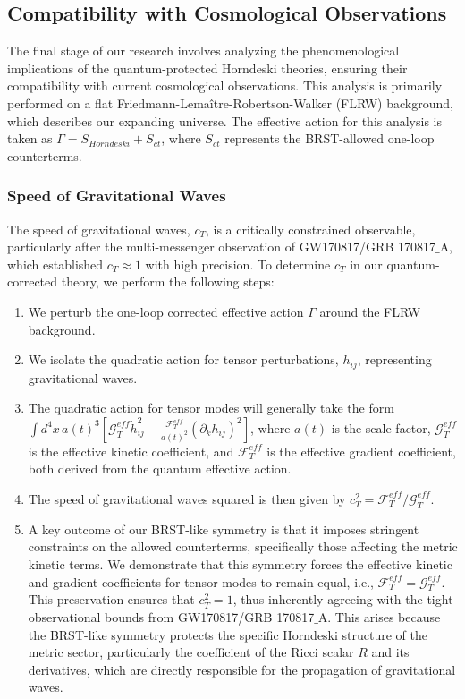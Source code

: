 \documentclass[twocolumn]{aastex631}
\begin{document}
\subsection{Compatibility with Cosmological Observations}

The final stage of our research involves analyzing the phenomenological implications of the quantum-protected Horndeski theories, ensuring their compatibility with current cosmological observations. This analysis is primarily performed on a flat Friedmann-Lemaître-Robertson-Walker (FLRW) background, which describes our expanding universe. The effective action for this analysis is taken as $\Gamma = S_{Horndeski} + S_{ct}$, where $S_{ct}$ represents the BRST-allowed one-loop counterterms.

\subsubsection{Speed of Gravitational Waves}
The speed of gravitational waves, $c_T$, is a critically constrained observable, particularly after the multi-messenger observation of GW170817/GRB 170817\ensuremath{\_}A, which established $c_T \approx 1$ with high precision. To determine $c_T$ in our quantum-corrected theory, we perform the following steps:
\begin{enumerate}
    \item We perturb the one-loop corrected effective action $\Gamma$ around the FLRW background.
    \item We isolate the quadratic action for tensor perturbations, $h_{ij}$, representing gravitational waves.
    \item The quadratic action for tensor modes will generally take the form $\int d^4x \, a(t)^3 \left[ \mathcal{G}_T^{eff} \dot{h}_{ij}^2 - \frac{\mathcal{F}_T^{eff}}{a(t)^2} (\partial_k h_{ij})^2 \right]$, where $a(t)$ is the scale factor, $\mathcal{G}_T^{eff}$ is the effective kinetic coefficient, and $\mathcal{F}_T^{eff}$ is the effective gradient coefficient, both derived from the quantum effective action.
    \item The speed of gravitational waves squared is then given by $c_T^2 = \mathcal{F}_T^{eff} / \mathcal{G}_T^{eff}$.
    \item A key outcome of our BRST-like symmetry is that it imposes stringent constraints on the allowed counterterms, specifically those affecting the metric kinetic terms. We demonstrate that this symmetry forces the effective kinetic and gradient coefficients for tensor modes to remain equal, i.e., $\mathcal{F}_T^{eff} = \mathcal{G}_T^{eff}$. This preservation ensures that $c_T^2 = 1$, thus inherently agreeing with the tight observational bounds from GW170817/GRB 170817\ensuremath{\_}A. This arises because the BRST-like symmetry protects the specific Horndeski structure of the metric sector, particularly the coefficient of the Ricci scalar $R$ and its derivatives, which are directly responsible for the propagation of gravitational waves.
\end{enumerate}
\end{document}

